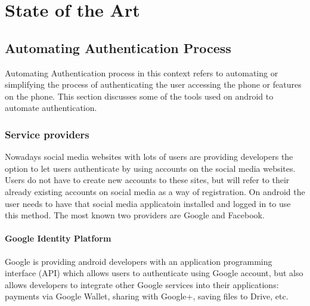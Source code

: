 
\chapter{State of the Art} %




\ifpdf
    \graphicspath{{X/figures/PNG/}{X/figures/PDF/}{X/figures/}}
\else
    \graphicspath{{X/figures/EPS/}{X/figures/}}
\fi



\section{Automating Authentication Process}
Automating Authentication process in this context refers to automating or simplifying the process of authenticating the user accessing the phone or features on the phone. This section discusses some of the tools used on android to automate authentication.

\subsection{Service providers}
Nowadays social media websites with lots of users are providing developers the option to let users authenticate by using accounts on the social media websites. Users do not have to create new accounts to these sites, but will refer to their already existing accounts on social media as a way of registration. On android the user needs to have that social media applicatoin installed and logged in to use this method. The most known two providers are Google and Facebook.

\subsubsection{Google Identity Platform}
Google is providing android developers with an application programming interface (API) which allows users to authenticate using Google account, but also allows developers to integrate other Google services into their applications: payments via Google Wallet, sharing with Google+, saving files to Drive, etc. 

